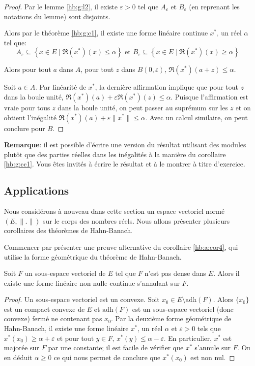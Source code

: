 \begin{proof}
  Par le lemme \ref{hb:g:l2}, il existe $\varepsilon > 0$ tel que $A_\varepsilon$
  et $B_\varepsilon$ (en reprenant les notations du lemme) sont disjoints.

  Alors par le théorème \ref{hb:g:c1}, il existe une forme linéaire continue $x^*$,
  un réel $\alpha$ tel que:
  $$A_\varepsilon\subseteq \left\{x\in E\mid \Re(x^*)(x) \leq \alpha\right\} \mbox{ et }
  B_\varepsilon \subseteq \left\{x\in E\mid \Re(x^*)(x) \geq \alpha\right\} $$

  Alors pour tout $a$ dans $A$, pour tout $z$ dans $B(0, \varepsilon)$,
  $\Re(x^*)(a + z) \leq \alpha$.

  Soit $a\in A$. Par linéarité de $x^*$, la dernière affirmation implique
  que pour tout $z$ dans la boule unité,
  $\Re(x^*)(a) + \varepsilon\Re(x^*)(z) \leq \alpha$.
  Puisque l'affirmation est vraie
  pour tous $z$ dans la boule unité, on peut
  passer au suprémum sur les $z$ et on obtient l'inégalité $\Re(x^*)(a)+
  \varepsilon \|x^*\|\leq \alpha$.
  Avec un calcul similaire, on peut conclure pour $B$.
\end{proof}

\textbf{Remarque}: il est possible d'écrire une version du résultat
utilisant des modules plutôt que des parties réelles dans les inégalités
à la manière du corollaire \ref{hb:g:cc1}. Vous êtes invités à écrire
le résultat et à le montrer à titre d'exercice.

\subsection{Applications}
Nous considérons à nouveau dans cette section un espace vectoriel
normé $(E, \|.\|)$ sur le corps des nombres réels. Nous allons
présenter plusieurs corollaires des théorèmes de Hahn-Banach.

Commencer par présenter une preuve alternative du corollaire \ref{hb:a:cor4},
qui utilise la forme géométrique du théorème de Hahn-Banach.
\begin{cor}
  Soit $F$ un sous-espace vectoriel de $E$ tel que $F$ n'est
  pas dense dans $E$. Alors il existe une forme linéaire non nulle
  continue s'annulant sur $F$.
\end{cor}
\begin{proof}
  Un sous-espace vectoriel est un convexe. Soit $x_0\in E\setminus\mathrm{adh}(F)$.
  Alors $\{x_0\}$ est un compact convexe de $E$ et $\mathrm{adh}(F)$
  est un sous-espace vectoriel (donc convexe) fermé ne contenant pas $x_0$.
  Par la deuxième forme géométrique de Hahn-Banach, il existe une forme
  linéaire $x^*$, un réel $\alpha$ et $\varepsilon >0$
  tels que $x^*(x_0)\geq \alpha + \varepsilon$  et
  pour tout $y\in F$, $x^*(y)\leq \alpha-\varepsilon$. En particulier, $x^*$ est majorée
  sur $F$ par une constante; il est facile de vérifier que $x^*$ s'annule
  sur $F$. On en déduit $\alpha \geq 0$ ce qui nous permet de conclure
  que $x^*(x_0)$ est non nul.
\end{proof}

